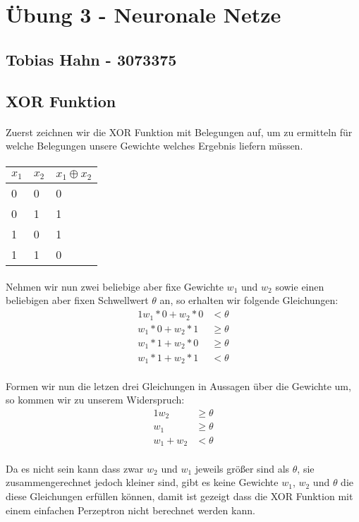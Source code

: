 \documentclass{article}
\begin{document}
\section*{Übung 3 - Neuronale Netze}
\subsection*{Tobias Hahn - 3073375}
\subsection*{XOR Funktion}
\paragraph{}
Zuerst zeichnen wir die XOR Funktion mit Belegungen auf, um zu ermitteln für welche Belegungen unsere Gewichte welches Ergebnis liefern müssen.
\paragraph{}
\begin{tabular}{|l|l|l|}
	\hline
	\( x_1 \) & \( x_2 \) & \( x_1 \oplus x_2 \) \\\hline
	0 & 0 & 0 \\\hline
	0 & 1 & 1 \\\hline
	1 & 0 & 1 \\\hline
	1 & 1 & 0 \\\hline
\end{tabular}
\paragraph{}
Nehmen wir nun zwei beliebige aber fixe Gewichte \( w_1 \) und \( w_2 \) sowie einen beliebigen aber fixen Schwellwert \( \theta \) an, so erhalten wir folgende Gleichungen:
\begin{alignat*}{1}
	w_1 * 0 + w_2 * 0 &<  \theta \\
	w_1 * 0 + w_2 * 1 &\ge  \theta \\
	w_1 * 1 + w_2 * 0 &\ge \theta \\
	w_1 * 1 + w_2 * 1 &< \theta
\end{alignat*}
\paragraph{}
Formen wir nun die letzen drei Gleichungen in Aussagen über die Gewichte um, so kommen wir zu unserem Widerspruch:
\begin{alignat*}{1}
	w_2 &\ge \theta \\
	w_1 &\ge \theta \\
	w_1 + w_2 &< \theta
\end{alignat*}
\paragraph{}
Da es nicht sein kann dass zwar \(w_2\) und \(w_1\) jeweils größer sind als \(\theta\), sie zusammengerechnet jedoch kleiner sind, gibt es keine Gewichte \(w_1\), \(w_2\) und \(\theta\) die diese Gleichungen erfüllen können, damit ist gezeigt dass die XOR Funktion mit einem einfachen Perzeptron nicht berechnet werden kann.
\end{document}
